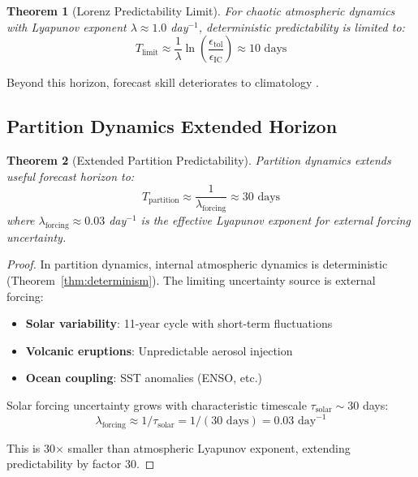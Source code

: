 \documentclass[twocolumn,10pt,a4paper]{article}
\newtheorem{theorem}{Theorem}[section]
\theoremstyle{definition}
\theoremstyle{remark}
\begin{document}
\begin{theorem}[Lorenz Predictability Limit]
\label{thm:lorenz_limit}
For chaotic atmospheric dynamics with Lyapunov exponent $\lambda \approx 1.0$ day$^{-1}$, deterministic predictability is limited to:
\begin{equation}
    T_{\text{limit}} \approx \frac{1}{\lambda}\ln\left(\frac{\epsilon_{\text{tol}}}{\epsilon_{\text{IC}}}\right) \approx 10 \text{ days}
\end{equation}
\end{theorem}

Beyond this horizon, forecast skill deteriorates to climatology \cite{zhang2019advancement}.

\subsection{Partition Dynamics Extended Horizon}

\begin{theorem}[Extended Partition Predictability]
\label{thm:extended_predict}
Partition dynamics extends useful forecast horizon to:
\begin{equation}
    T_{\text{partition}} \approx \frac{1}{\lambda_{\text{forcing}}} \approx 30 \text{ days}
\end{equation}
where $\lambda_{\text{forcing}} \approx 0.03$ day$^{-1}$ is the effective Lyapunov exponent for external forcing uncertainty.
\end{theorem}

\begin{proof}
In partition dynamics, internal atmospheric dynamics is deterministic (Theorem~\ref{thm:determinism}). The limiting uncertainty source is external forcing:
\begin{itemize}
    \item \textbf{Solar variability}: 11-year cycle with short-term fluctuations
    \item \textbf{Volcanic eruptions}: Unpredictable aerosol injection
    \item \textbf{Ocean coupling}: SST anomalies (ENSO, etc.)
\end{itemize}

Solar forcing uncertainty grows with characteristic timescale $\tau_{\text{solar}} \sim 30$ days:
\begin{equation}
    \lambda_{\text{forcing}} \approx 1/\tau_{\text{solar}} = 1/(30 \text{ days}) = 0.03 \text{ day}^{-1}
\end{equation}

This is 30$\times$ smaller than atmospheric Lyapunov exponent, extending predictability by factor 30.
\end{proof}
\end{document}
